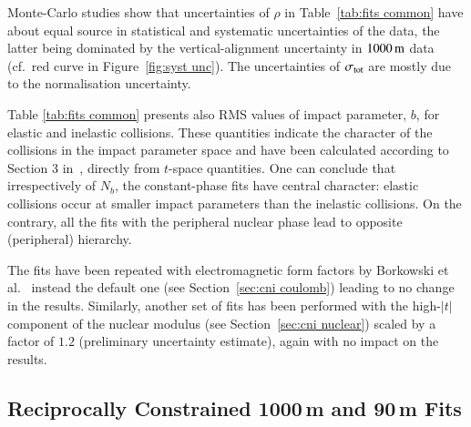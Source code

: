 Monte-Carlo studies show that uncertainties of $\rho$ in Table~\ref{tab:fits common} have about equal source in statistical and systematic uncertainties of the data, the latter being dominated by the vertical-alignment uncertainty in $1000\,{\rm m}$ data (cf.~red curve in Figure~\ref{fig:syst unc}).
The uncertainties of $\sigma_{\rm tot}$ are mostly due to the normalisation uncertainty.

Table \ref{tab:fits common} presents also RMS values of impact parameter, $b$, for elastic and inelastic collisions. These quantities indicate the character of the collisions in the impact parameter space and have been calculated according to Section 3 in~\cite{klk02}, directly from $t$-space quantities. One can conclude that irrespectively of $N_b$, the constant-phase fits have central character: elastic collisions occur at smaller impact parameters than the inelastic collisions. On the contrary, all the fits with the peripheral nuclear phase lead to opposite (peripheral) hierarchy.

The fits have been repeated with electromagnetic form factors by Borkowski et al.~\cite{borkowski} instead the default one (see Section~\ref{sec:cni coulomb}) leading to no change in the results. Similarly, another set of fits has been performed with the high-$|t|$ component of the nuclear modulus (see Section~\ref{sec:cni nuclear}) scaled by a factor of $1.2$ (preliminary uncertainty estimate), again with no impact on the results.



\subsection{Reciprocally Constrained 1000\,m and 90\,m Fits}
\label{sec:cni reciprocal fits}


